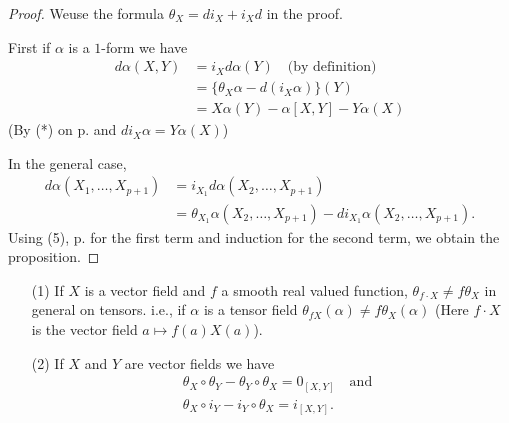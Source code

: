 \begin{proof}
We\pageoriginale use the formula $\theta_{X}=di_{X}+i_{X}d$ in the proof.

First if $\alpha$ is a $1$-form we have
\begin{align*}
d\alpha(X,Y) &= i_{X}d\alpha(Y)\quad \text{(by definition)}\\[3pt]
             &= \{\theta_{X}\alpha-d(i_{X}\alpha)\}(Y)\\[3pt]
             &= X\alpha(Y)-\alpha[X,Y]-Y\alpha(X)
\end{align*}
(By (*) on p.\pageref{page28} and $di_{X}\alpha=Y\alpha(X)$)

In the general case,
\begin{align*}
d\alpha(X_{1},\ldots,X_{p+1}) &= i_{X_{1}}d\alpha(X_{2},\ldots,X_{p+1})\\[3pt]
                            &= \theta_{X_{1}}\alpha(X_{2},\ldots,X_{p+1})-di_{X_{1}}\alpha(X_{2},\ldots,X_{p+1}).
\end{align*}
Using (5), p.\pageref{page27} for the first term and induction for the second term, we obtain the proposition.
\end{proof}

\begin{remarks*}
\begin{itemize}
\item[(1)] If $X$ is a vector field and $f$ a smooth real valued function, $\theta_{f\cdot X}\neq f\theta_{X}$ in general on tensors. i.e., if $\alpha$ is a tensor field $\theta_{fX}(\alpha)\neq f\theta_{X}(\alpha)$ (Here $f\cdot X$ is the vector field $a\mapsto f(a)X(a)$).

\item[(2)] If $X$ and $Y$ are vector fields we have
\begin{align*}
& \theta_{X}\circ \theta_{Y}-\theta_{Y}\circ \theta_{X}=0_{[X,Y]}\quad\text{and}\\[3pt]
& \theta_{X}\circ i_{Y}-i_{Y}\circ \theta_{X}=i_{[X,Y]}.
\end{align*}
\end{itemize}
\end{remarks*}




